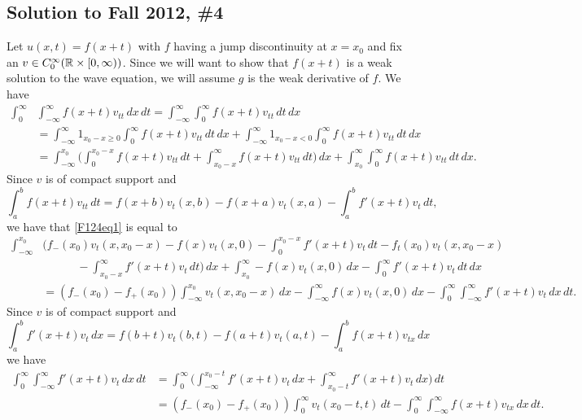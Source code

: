 \subsection*{Solution to Fall 2012, \#4}

Let $u(x, t) = f(x + t)$ with $f$ having a jump discontinuity at $x = x_{0}$ and fix an $v \in C_{0}^{\infty}(\mathbb{R} \times [0, \infty))$. Since we will want to show that
$f(x + t)$ is a weak solution to the wave equation, we will assume $g$ is the weak derivative of $f$.
We have
\begin{align}\label{F124eq1}
\int_{0}^{\infty}&\int_{-\infty}^{\infty}f(x + t)v_{tt}\, dx\, dt = \int_{-\infty}^{\infty}\int_{0}^{\infty}f(x + t)v_{tt}\, dt\, dx\nonumber\\
&= \int_{-\infty}^{\infty}1_{x_{0} - x \geq 0}\int_{0}^{\infty}f(x + t)v_{tt}\, dt\, dx + \int_{-\infty}^{\infty}1_{x_{0} - x < 0}\int_{0}^{\infty}f(x + t)v_{tt}\, dt\, dx\nonumber\\
&= \int_{-\infty}^{x_{0}}\bigg(\int_{0}^{x_{0} - x}f(x + t)v_{tt}\, dt + \int_{x_{0} - x}^{\infty}f(x + t)v_{tt}\, dt\bigg)\, dx + \int_{x_{0}}^{\infty}\int_{0}^{\infty}f(x + t)v_{tt}\, dt\, dx.
\end{align}
Since $v$ is of compact support and
$$\int_{a}^{b}f(x + t)v_{tt}\, dt = f(x + b)v_{t}(x, b) - f(x + a)v_{t}(x, a) - \int_{a}^{b}f'(x + t)v_{t}\, dt,$$
we have that \eqref{F124eq1} is equal to
\begin{equation}
\begin{aligned}\label{F124eq2}
\int_{-\infty}^{x_{0}}&\bigg(f_{-}(x_{0})v_{t}(x, x_{0} - x) - f(x)v_{t}(x, 0) - \int_{0}^{x_{0} - x}f'(x + t)v_{t}\, dt - f_{t}(x_{0})v_{t}(x, x_{0} - x)\\
&\quad\quad\quad - \int_{x_{0} - x}^{\infty}f'(x + t)v_{t}\, dt\bigg)\, dx + \int_{x_{0}}^{\infty}-f(x)v_{t}(x, 0)\, dx - \int_{0}^{\infty}f'(x + t)v_{t}\, dt\, dx\\
&= (f_{-}(x_{0}) - f_{+}(x_{0}))\int_{-\infty}^{x_{0}}v_{t}(x, x_{0} - x)\, dx - \int_{-\infty}^{\infty}f(x)v_{t}(x, 0)\, dx - \int_{0}^{\infty}\int_{-\infty}^{\infty}f'(x + t)v_{t}\, dx\, dt.
\end{aligned}
\end{equation}
Since $v$ is of compact support and
$$\int_{a}^{b}f'(x + t)v_{t}\, dx = f(b + t)v_{t}(b, t) - f(a + t)v_{t}(a, t) - \int_{a}^{b}f(x + t)v_{tx}\, dx$$
we have
\begin{equation}
\begin{aligned}\label{F124eq3}
\int_{0}^{\infty}\int_{-\infty}^{\infty}f'(x + t)v_{t}\, dx\, dt &= \int_{0}^{\infty}\bigg(\int_{-\infty}^{x_{0} - t}f'(x + t)v_{t}\, dx + \int_{x_{0} - t}^{\infty}f'(x + t)v_{t}\, dx\bigg)\, dt\\
&= (f_{-}(x_{0}) - f_{+}(x_{0}))\int_{0}^{\infty}v_{t}(x_{0} - t, t)\, dt - \int_{0}^{\infty}\int_{-\infty}^{\infty}f(x + t)v_{tx}\, dx\, dt.
\end{aligned}
\end{equation}
